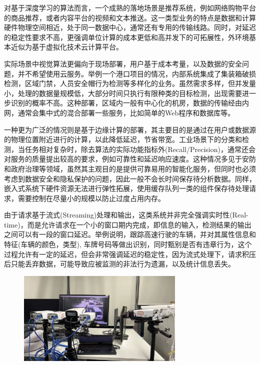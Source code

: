 \documentclass[master]{shtthesis}
\begin{document}
对基于深度学习的算法而言，一个成熟的落地场景是推荐系统，例如网络购物平台的商品推荐，或者内容平台的视频和文本推送。这一类型业务的特点是数据和计算硬件物理空间相近，处于同一数据中心，通常还有专用的传输线路。同时，对延迟的稳定性要求不高，更强调单位计算的成本更低和高并发下的可拓展性，外环境基本近似为基于虚拟化技术云计算平台。

实际场景中视觉算法更偏向于现场部署，用户基于成本考量，以及数据的安全问题，并不希望使用云服务。举例一个港口项目的情况，内部系统集成了集装箱破损检测，区域门禁，人员安全帽行为检测等多样化的业务。虽然需求多样，但并发量小，处理的数据量规模低，大部分时间只执行有限种类的目标检测，出现需要进一步识别的概率不高。这种部署，区域内一般有中心化的机房，数据的传输经由内网，通常会集中式的混合部署一些服务，比如简单的Web程序和数据库等。

一种更为广泛的情况则是基于边缘计算的部署，其主要目的是通过在用户或数据源的物理位置附近进行的计算，以此降低延迟，节省带宽。工业场景下的分类和检测，当任务相对复杂时，除去算法的实际功能指标外(Recall/Precision)，通常还会对服务的质量提出较高的要求，例如可靠性和延迟响应速度。这种情况多见于安防和政府治理等领域，虽然其主观目的是提供可靠易用的智能化服务，但同时也必须考虑到数据安全和隐私保护的问题，因此一般不会长时间保存待分析数据。同样，嵌入式系统下硬件资源无法进行弹性拓展，使用缓存队列一类的组件保存待处理请求，需要控制在尽量小的规模以防止过度占用内存。

由于请求基于流式(Streaming)\cite{muthukrishnan2005data}处理和输出，这类系统并非完全强调实时性(Real-time)，而是允许请求在一个小的窗口期内完成，即信息的输入，检测结果的输出之间可以有一段的窗口延迟。举例说明，跟踪高速行驶的车辆，并对其属性信息和特征(车辆的颜色，类型), 车牌号码等做出识别，同时甄别是否有违章行为，这个过程允许有一定的延迟，但会非常强调延迟的稳定性，因为流式处理下，请求积压后只能丢弃数据，可能导致应被监测的非法行为遗漏，以及统计信息丢失。

\begin{figure}[htbp]
	\centering
	\includegraphics[width=8cm]{img/hd.jpeg}
	\label{有线直连的超清摄像头}
\end{figure}
\end{document}
